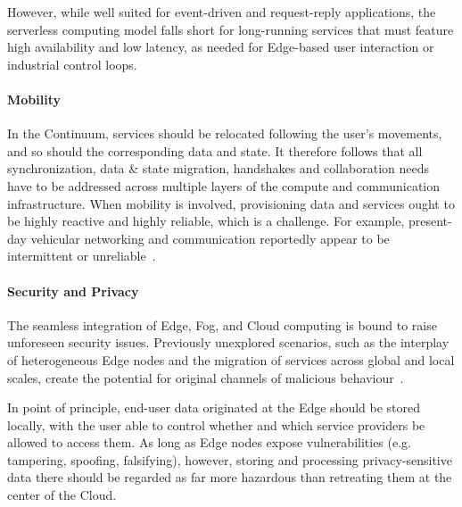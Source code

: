 However, while well suited for event-driven and request-reply applications, the serverless computing model falls short for long-running services that must feature high availability and low latency, as needed for Edge-based user interaction or industrial control loops.
 

\paragraph{Mobility}
In the Continuum, services should be relocated following the user's movements, and so should the corresponding data and state. 
It therefore follows that all synchronization, data \& state migration, handshakes and collaboration needs have to be addressed across multiple layers of the compute and communication infrastructure.
When mobility is involved, provisioning data and services ought to be highly reactive and highly reliable, which is a challenge. 
For example, present-day vehicular networking and communication reportedly appear to be intermittent or unreliable~\cite{he2014developing}.

\paragraph{Security and Privacy}

The seamless integration of Edge, Fog, and Cloud computing is bound to raise unforeseen security issues. Previously unexplored scenarios, such as the interplay of heterogeneous Edge nodes and the migration of services across global and local scales, create the potential for original channels of malicious behaviour~\cite{yu2017survey}.

In point of principle, end-user data originated at the Edge should be stored locally, with the user able to control whether and which service providers be allowed to access them. 
As long as Edge nodes expose vulnerabilities (e.g. tampering, spoofing, falsifying), however, storing and processing privacy-sensitive data there should be regarded as far more hazardous than retreating them at the center of the Cloud.

